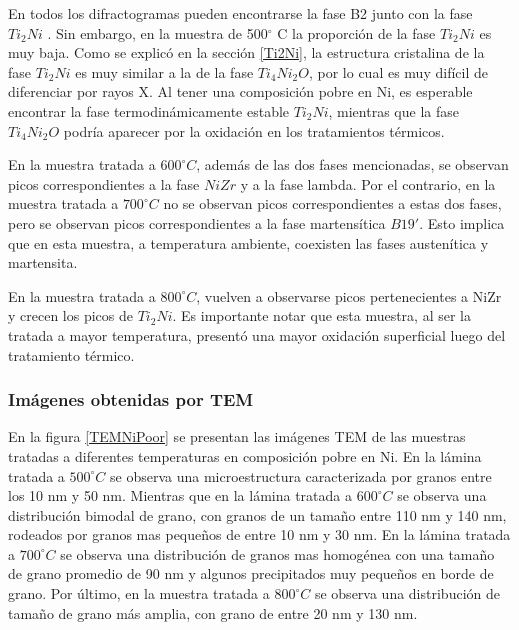 \documentclass[12pt]{article}
\theoremstyle{definition}
\theoremstyle{remark}
\begin{document}
{En todos los difractogramas pueden encontrarse la fase B2 junto con la fase $Ti_2Ni$ . Sin embargo, en la muestra de 500$^\circ$ C la proporción de la fase $Ti_2 Ni$ es muy baja. Como se explicó en la sección \ref{Ti2Ni}, la estructura cristalina de la fase $Ti_2 Ni$ es muy similar a la de la fase $Ti_4Ni_2O$, por lo cual es muy difícil de diferenciar por rayos X. Al tener una composición pobre en Ni, es esperable encontrar la fase termodinámicamente estable $Ti_2 Ni$, mientras que la fase $Ti_4Ni_2O$ podría aparecer por la oxidación en los tratamientos térmicos.

En la muestra tratada a $600 ^\circ C$, además de las dos fases mencionadas, se observan picos correspondientes a la fase $NiZr$ y a la fase lambda. Por el contrario, en la muestra tratada a $700 ^\circ C$ no se observan picos correspondientes a estas dos fases, pero se observan picos correspondientes a la fase martensítica $B19'$. Esto implica que en esta muestra, a temperatura ambiente, coexisten las fases austenítica y martensita.

En la muestra tratada a $800 ^\circ C$, vuelven a observarse picos pertenecientes a NiZr y crecen los picos de $Ti_2 Ni$. Es importante notar que esta muestra, al ser la tratada a mayor temperatura, presentó una mayor oxidación superficial luego del tratamiento térmico. 


\subsubsection{Imágenes obtenidas por TEM}
\label{TemNiPoorResults}

En la figura \ref{TEMNiPoor} se presentan las imágenes TEM de las muestras tratadas a diferentes temperaturas en composición pobre en Ni. En la lámina tratada a $500 ^\circ C$ se observa una microestructura caracterizada por granos entre los 10 nm y 50 nm. Mientras que en la lámina tratada a $600 ^\circ C$ se observa una distribución bimodal de grano, con granos de un tamaño entre 110 nm y 140 nm, rodeados por granos mas pequeños de entre 10 nm y 30 nm. En la lámina tratada a $700 ^\circ C$ se observa una distribución de granos mas homogénea con una tamaño de grano promedio de 90 nm y algunos precipitados muy pequeños en borde de grano. Por último, en la muestra tratada a $800 ^\circ C$ se observa una distribución de tamaño de grano más amplia, con grano de entre 20 nm y 130 nm.

}
\end{document}
